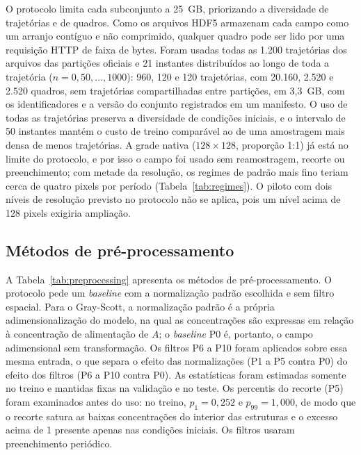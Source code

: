 \documentclass[final,5p,times,twocolumn]{elsarticle}
\begin{document}
O protocolo limita cada subconjunto a 25~GB, priorizando a diversidade de trajetórias e de quadros. Como os arquivos HDF5 armazenam cada campo como um arranjo contíguo e não comprimido, qualquer quadro pode ser lido por uma requisição HTTP de faixa de bytes. Foram usadas todas as 1.200 trajetórias dos arquivos das partições oficiais e 21 instantes distribuídos ao longo de toda a trajetória ($n=0,50,\dots,1000$): 960, 120 e 120 trajetórias, com 20.160, 2.520 e 2.520 quadros, sem trajetórias compartilhadas entre partições, em 3,3~GB, com os identificadores e a versão do conjunto registrados em um manifesto. O uso de todas as trajetórias preserva a diversidade de condições iniciais, e o intervalo de 50 instantes mantém o custo de treino comparável ao de uma amostragem mais densa de menos trajetórias. A grade nativa ($128\times128$, proporção 1:1) já está no limite do protocolo, e por isso o campo foi usado sem reamostragem, recorte ou preenchimento; com metade da resolução, os regimes de padrão mais fino teriam cerca de quatro pixels por período (Tabela~\ref{tab:regimes}). O piloto com dois níveis de resolução previsto no protocolo não se aplica, pois um nível acima de 128 pixels exigiria ampliação.

\subsection{Métodos de pré-processamento}\label{subsec:preprocessing}

A Tabela~\ref{tab:preprocessing} apresenta os métodos de pré-processamento. O protocolo pede um \textit{baseline} com a normalização padrão escolhida e sem filtro espacial. Para o Gray-Scott, a normalização padrão é a própria adimensionalização do modelo, na qual as concentrações são expressas em relação à concentração de alimentação de $A$; o \textit{baseline} P0 é, portanto, o campo adimensional sem transformação. Os filtros P6 a P10 foram aplicados sobre essa mesma entrada, o que separa o efeito das normalizações (P1 a P5 contra P0) do efeito dos filtros (P6 a P10 contra P0). As estatísticas foram estimadas somente no treino e mantidas fixas na validação e no teste. Os percentis do recorte (P5) foram examinados antes do uso: no treino, $p_1=0,252$ e $p_{99}=1,000$, de modo que o recorte satura as baixas concentrações do interior das estruturas e o excesso acima de 1 presente apenas nas condições iniciais. Os filtros usaram preenchimento periódico.
\end{document}
